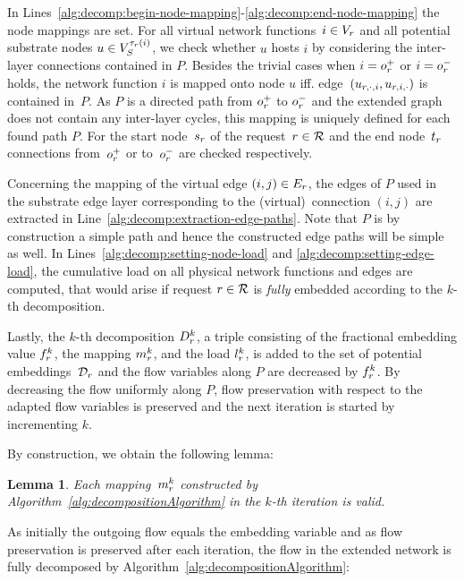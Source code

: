\documentclass[10pt, conference, letterpaper]{IEEEtran}
\newtheorem{lemma}[theorem]{Lemma}
\begin{document}
In Lines~\ref{alg:decomp:begin-node-mapping}-\ref{alg:decomp:end-node-mapping} the node mappings are set. 
For all virtual network functions~$i \in \VV$ and all potential substrate nodes $u \in \SVTypes[\Vtype(i)]$, we check whether $u$ hosts $i$ by considering the inter-layer connections contained in $P$.
Besides the trivial cases when $i = \Vsource$ or $i = \Vsink$ holds, the network function $i$ is mapped onto node $u$ iff. edge~$(u_{\req,\cdot,i},u_{\req,i,\cdot})$ is contained 
in~$P$. As $P$ is a directed path from $\Vsource$ to $\Vsink$ and the extended graph does not contain any inter-layer cycles, this mapping is uniquely defined for each found path $P$. 
For the start node~$\Vstart$ of the request~$\req \in \requests$ and the end 
node~$\Vend$ connections from~$\Vsource$ or to~$\Vsink$ are checked respectively.

Concerning the mapping of the virtual edge $(i,j) \in  \VE$, the edges of $P$ used in the substrate edge layer corresponding to the (virtual)~connection $(i,j)$ are extracted in Line~\ref{alg:decomp:extraction-edge-paths}. Note that $P$ is by construction a simple path and hence the constructed edge paths will be simple as well. In Lines~\ref{alg:decomp:setting-node-load} and \ref{alg:decomp:setting-edge-load}, the cumulative load on all physical network functions and edges are computed, that would arise if request $\req \in \requests$ is \emph{fully} embedded according to the $k$-th decomposition.

Lastly, the $k$-th decomposition $D^k_{\req}$, a triple consisting of the fractional embedding value $\prob$, the mapping $\mapping$, and the load $\load$, is added to 
the set of potential embeddings~$\PotEmbeddings$ and the flow variables along $P$ are decreased by $f^k_{\req}$. By decreasing the flow uniformly along $P$, flow preservation with respect to the adapted flow variables is preserved and the next iteration is started by incrementing $k$.

By construction, we obtain the following lemma:
\begin{lemma}
\label{lem:validity-of-kth-decomposition}
Each mapping~$m^k_{\req}$  constructed by Algorithm~\ref{alg:decompositionAlgorithm} in the $k$-th iteration is \emph{valid}.
\end{lemma}

As initially the outgoing flow equals the embedding variable and as flow preservation is preserved after each iteration, the flow in the extended network is fully decomposed by Algorithm~\ref{alg:decompositionAlgorithm}:
\end{document}
